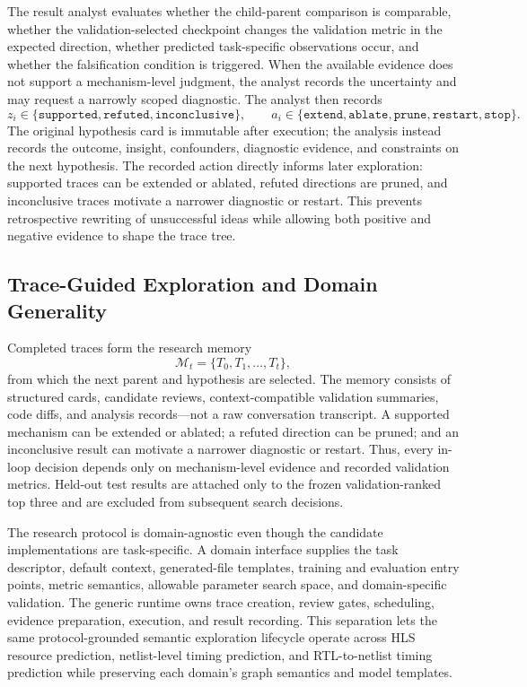 The result analyst evaluates whether the child-parent comparison is comparable, whether the validation-selected checkpoint changes the validation metric in the expected direction, whether predicted task-specific observations occur, and whether the falsification condition is triggered. When the available evidence does not support a mechanism-level judgment, the analyst records the uncertainty and may request a narrowly scoped diagnostic. The analyst then records
\begin{equation}
z_i\in\{\texttt{supported},\texttt{refuted},\texttt{inconclusive}\},
\qquad
a_i\in\{\texttt{extend},\texttt{ablate},\texttt{prune},\texttt{restart},\texttt{stop}\}.
\label{eq:outcome_action}
\end{equation}
The original hypothesis card is immutable after execution; the analysis instead records the outcome, insight, confounders, diagnostic evidence, and constraints on the next hypothesis. The recorded action directly informs later exploration: supported traces can be extended or ablated, refuted directions are pruned, and inconclusive traces motivate a narrower diagnostic or restart. This prevents retrospective rewriting of unsuccessful ideas while allowing both positive and negative evidence to shape the trace tree.

\subsection{Trace-Guided Exploration and Domain Generality}
\label{sec:trace_guided_exploration}

Completed traces form the research memory
\begin{equation}
    \mathcal{M}_t=\{T_0,T_1,\ldots,T_t\},
\end{equation}
from which the next parent and hypothesis are selected. The memory consists of structured cards, candidate reviews, context-compatible validation summaries, code diffs, and analysis records---not a raw conversation transcript. A supported mechanism can be extended or ablated; a refuted direction can be pruned; and an inconclusive result can motivate a narrower diagnostic or restart. Thus, every in-loop decision depends only on mechanism-level evidence and recorded validation metrics. Held-out test results are attached only to the frozen validation-ranked top three and are excluded from subsequent search decisions.

The research protocol is domain-agnostic even though the candidate implementations are task-specific. A domain interface supplies the task descriptor, default context, generated-file templates, training and evaluation entry points, metric semantics, allowable parameter search space, and domain-specific validation. The generic runtime owns trace creation, review gates, scheduling, evidence preparation, execution, and result recording. This separation lets the same protocol-grounded semantic exploration lifecycle operate across HLS resource prediction, netlist-level timing prediction, and RTL-to-netlist timing prediction while preserving each domain's graph semantics and model templates.


